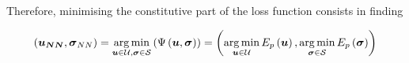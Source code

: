 Therefore, minimising the constitutive part of the loss function consists in finding 

\begin{equation}
	\left(\vect{u_{NN}},\sigm_{NN}\right) = \argmin_{\vect{u}\in \mathcal{U}, \sigm \in \mathcal{S}} \left(\Psi\left(\vect{u},\sigm\right)\right) =  \left(\argmin_{\vect{u}\in \mathcal{U}}E_p\left(\vect{u}\right),\argmin_{\sigm\in \mathcal{S}}E_p\left(\sigm\right)\right) 
\end{equation}